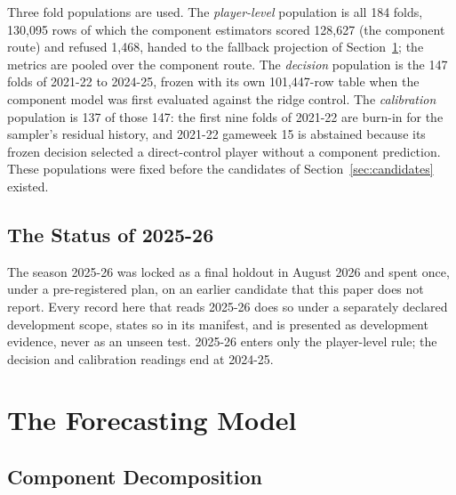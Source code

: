 \documentclass[11pt,a4paper]{article}
\begin{document}
Three fold populations are used. The \emph{player-level} population is all 184 folds, 130{,}095 rows of which the component estimators scored 128{,}627 (the component route) and refused 1{,}468, handed to the fallback projection of Section~\ref{sec:model}; the metrics are pooled over the component route. The \emph{decision} population is the 147 folds of 2021-22 to 2024-25, frozen with its own 101{,}447-row table when the component model was first evaluated against the ridge control. The \emph{calibration} population is 137 of those 147: the first nine folds of 2021-22 are burn-in for the sampler's residual history, and 2021-22 gameweek 15 is abstained because its frozen decision selected a direct-control player without a component prediction. These populations were fixed before the candidates of Section~\ref{sec:candidates} existed.


\subsection{The Status of 2025-26}

The season 2025-26 was locked as a final holdout in August 2026 and spent once, under a pre-registered plan, on an earlier candidate that this paper does not report. Every record here that reads 2025-26 does so under a separately declared development scope, states so in its manifest, and is presented as development evidence, never as an unseen test. 2025-26 enters only the player-level rule; the decision and calibration readings end at 2024-25.

\section{The Forecasting Model}
\label{sec:model}

\subsection{Component Decomposition}
\end{document}
